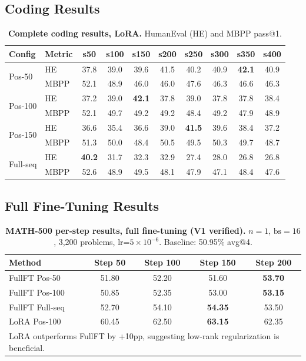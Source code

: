 \documentclass[10pt]{article}
\begin{document}
\subsection{Coding Results}

\begin{table}[!htbp]
\centering
\caption{\textbf{Complete coding results, LoRA.} HumanEval (HE) and MBPP pass@1.}
\label{tab:app_coding_lora}
\footnotesize
\begin{tabular}{llcccccccc}
\toprule
\textbf{Config} & \textbf{Metric} & \textbf{s50} & \textbf{s100} & \textbf{s150} & \textbf{s200} & \textbf{s250} & \textbf{s300} & \textbf{s350} & \textbf{s400} \\
\midrule
\multirow{2}{*}{Pos-50} & HE & 37.8 & 39.0 & 39.6 & 41.5 & 40.2 & 40.9 & \textbf{42.1} & 40.9 \\
 & MBPP & 52.1 & 48.9 & 46.0 & 46.0 & 47.6 & 46.3 & 46.6 & 46.3 \\
\midrule
\multirow{2}{*}{Pos-100} & HE & 37.2 & 39.0 & \textbf{42.1} & 37.8 & 39.0 & 37.8 & 37.8 & 38.4 \\
 & MBPP & 52.1 & 49.7 & 49.2 & 49.2 & 48.4 & 49.2 & 47.9 & 48.9 \\
\midrule
\multirow{2}{*}{Pos-150} & HE & 36.6 & 35.4 & 36.6 & 39.0 & \textbf{41.5} & 39.6 & 38.4 & 37.2 \\
 & MBPP & 51.3 & 50.0 & 48.4 & 50.5 & 49.5 & 50.3 & 49.7 & 48.7 \\
\midrule
\multirow{2}{*}{Full-seq} & HE & \textbf{40.2} & 31.7 & 32.3 & 32.9 & 27.4 & 28.0 & 26.8 & 26.8 \\
 & MBPP & 52.6 & 48.9 & 49.5 & 48.1 & 47.9 & 47.1 & 48.4 & 47.6 \\
\bottomrule
\end{tabular}
\end{table}


\subsection{Full Fine-Tuning Results}

\begin{table}[!htbp]
\centering
\caption{\textbf{MATH-500 per-step results, full fine-tuning (V1 verified).} $n{=}1$, $\text{bs}{=}16$, 3,200 problems, lr=$5{\times}10^{-6}$. Baseline: 50.95\% avg@4.}
\label{tab:app_math_fullft}
\small
\begin{tabular}{l cccc}
\toprule
\textbf{Method} & \textbf{Step 50} & \textbf{Step 100} & \textbf{Step 150} & \textbf{Step 200} \\
\midrule
FullFT Pos-50 & 51.80 & 52.20 & 51.60 & \textbf{53.70} \\
FullFT Pos-100 & 50.85 & 52.35 & 53.00 & \textbf{53.15} \\
FullFT Full-seq & 52.70 & 54.10 & \textbf{54.35} & 53.50 \\
\midrule
LoRA Pos-100 & 60.45 & 62.50 & \textbf{63.15} & 62.35 \\
\bottomrule
\multicolumn{5}{l}{\footnotesize LoRA outperforms FullFT by +10pp, suggesting low-rank regularization is beneficial.}
\end{tabular}
\end{table}
\end{document}
